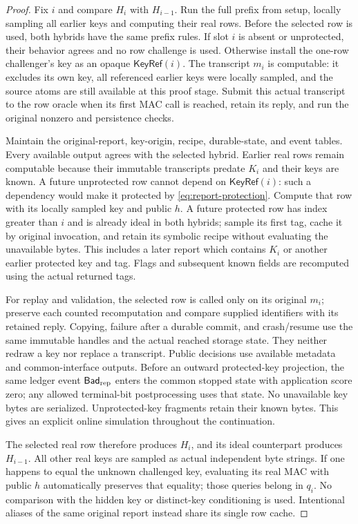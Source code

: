 \begin{proof}
Fix $i$ and compare $H_i$ with $H_{i-1}$.  Run the full prefix from setup,
locally sampling all earlier keys and computing their real rows.  Before the
selected row is used, both hybrids have the same prefix rules.  If slot $i$
is absent or unprotected, their behavior agrees and no row challenge is used.
Otherwise install the one-row challenger's key as an opaque
$\mathsf{KeyRef}(i)$.  The transcript $m_i$ is computable: it excludes its own
key, all referenced earlier keys were locally sampled, and the source atoms
are still available at this proof stage.  Submit this actual transcript to
the row oracle when its first MAC call is reached, retain its reply, and run
the original nonzero and persistence checks.

Maintain the original-report, key-origin, recipe, durable-state, and event
tables.  Every available output agrees with the selected hybrid.  Earlier
real rows remain computable because their immutable transcripts predate
$K_i$ and their keys are known.  A future unprotected row cannot depend on
$\mathsf{KeyRef}(i)$: such a dependency would make it protected by
\eqref{eq:report-protection}.  Compute that row with its locally sampled key
and public $h$.  A future protected row has index greater than $i$ and is
already ideal in both hybrids; sample its first tag, cache it by original
invocation, and retain its symbolic recipe without evaluating the unavailable
bytes.  This includes a later report which contains $K_i$ or another earlier
protected key and tag.  Flags and subsequent known fields are recomputed
using the actual returned tags.

For replay and validation, the selected row is called only on its original
$m_i$; preserve each counted recomputation and compare supplied identifiers
with its retained reply.  Copying, failure after a durable commit, and
crash/resume use the same immutable handles and the actual reached storage
state.  They neither redraw a key nor replace a transcript.  Public decisions
use available metadata and common-interface outputs.  Before an outward
protected-key projection, the same ledger event
$\mathsf{Bad}_{\rm rep}$ enters the common stopped state with application
score zero; any allowed terminal-bit postprocessing uses that state.  No
unavailable key bytes are serialized.  Unprotected-key fragments retain their known bytes.
This gives an explicit online simulation throughout the continuation.

The selected real row therefore produces $H_i$, and its ideal counterpart
produces $H_{i-1}$.  All other real keys are sampled as actual independent byte
strings.  If one happens to equal the unknown challenged key, evaluating its
real MAC with public $h$ automatically preserves that equality; those queries
belong in $q_i$.  No comparison with the hidden key or distinct-key conditioning
is used.  Intentional aliases of the same original report instead share its
single row cache.


\end{proof}
